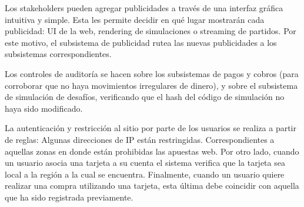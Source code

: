 Los stakeholders pueden agregar publicidades a través de una interfaz gráfica intuitiva y simple. Esta les permite decidir en qué lugar mostrarán cada publicidad: UI de la web,
rendering de simulaciones o streaming de partidos. Por este motivo, el subsistema de publicidad rutea las nuevas publicidades a los subsistemas correspondientes.

Los controles de auditoría se hacen sobre los subsistemas de pagos y cobros (para corroborar que no haya movimientos irregulares de dinero), y sobre el subsistema de simulación de
desafíos, verificando que el hash del código de simulación no haya sido modificado.

La autenticación y restricción al sitio por parte de los usuarios se realiza a partir de reglas: Algunas direcciones de IP están restringidas. Correspondientes a aquellas zonas en donde
están prohibidas las apuestas web. Por otro lado, cuando un usuario asocia una tarjeta a su cuenta el sistema verifica que la tarjeta sea local a la región a la cual se encuentra.
Finalmente, cuando un usuario quiere realizar una compra utilizando una tarjeta, esta última debe coincidir con aquella que ha sido registrada previamente.

